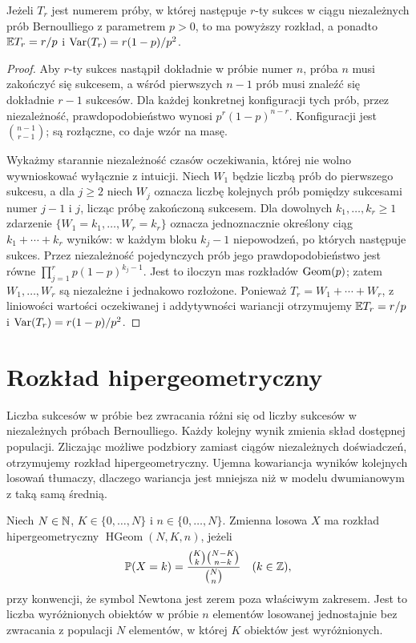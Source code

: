 \begin{stwierdzenie}
Jeżeli $T_r$ jest numerem próby, w której następuje $r$-ty sukces
w ciągu niezależnych prób Bernoulliego z parametrem $p>0$,
to ma powyższy rozkład, a ponadto
$\mathbb{E} T_r=r/p$ i $\operatorname{Var}(T_r)=r(1-p)/p^2$.
\end{stwierdzenie}
\begin{proof}
Aby $r$-ty sukces nastąpił dokładnie w próbie numer $n$,
próba $n$ musi zakończyć się sukcesem, a wśród pierwszych
$n-1$ prób musi znaleźć się dokładnie $r-1$ sukcesów.
Dla każdej konkretnej konfiguracji tych prób, przez
niezależność, prawdopodobieństwo wynosi
$p^r(1-p)^{n-r}$. Konfiguracji jest
$\binom{n-1}{r-1}$; są rozłączne, co daje wzór na masę.

Wykażmy starannie niezależność czasów oczekiwania,
której nie wolno wywnioskować wyłącznie z intuicji.
Niech $W_1$ będzie liczbą prób do pierwszego sukcesu,
a dla $j\geq2$ niech $W_j$ oznacza liczbę kolejnych prób
pomiędzy sukcesami numer $j-1$ i $j$, licząc próbę
zakończoną sukcesem. Dla dowolnych $k_1,\ldots,k_r\geq1$
zdarzenie $\{W_1=k_1,\ldots,W_r=k_r\}$ oznacza
jednoznacznie określony ciąg
$k_1+\cdots+k_r$ wyników: w każdym bloku $k_j-1$
niepowodzeń, po których następuje sukces.
Przez niezależność pojedynczych prób jego
prawdopodobieństwo jest równe
$\prod_{j=1}^r p(1-p)^{k_j-1}$.
Jest to iloczyn mas rozkładów $\operatorname{Geom}(p)$;
zatem $W_1,\ldots,W_r$ są niezależne i jednakowo
rozłożone. Ponieważ $T_r=W_1+\cdots+W_r$,
z liniowości wartości oczekiwanej i addytywności
wariancji otrzymujemy
$\mathbb{E} T_r=r/p$ i $\operatorname{Var}(T_r)=r(1-p)/p^2$.
\end{proof}

\section{Rozkład hipergeometryczny}
Liczba sukcesów w próbie bez zwracania różni się od liczby
sukcesów w niezależnych próbach Bernoulliego. Każdy kolejny
wynik zmienia skład dostępnej populacji. Zliczając możliwe
podzbiory zamiast ciągów niezależnych doświadczeń, otrzymujemy
rozkład hipergeometryczny. Ujemna kowariancja wyników kolejnych
losowań tłumaczy, dlaczego wariancja jest mniejsza niż w modelu
dwumianowym z taką samą średnią.

\begin{definicja}
Niech $N\in\mathbb{N}$, $K\in\{0,\ldots,N\}$
i $n\in\{0,\ldots,N\}$.
Zmienna losowa $X$ ma rozkład hipergeometryczny
$\operatorname{HGeom}(N,K,n)$, jeżeli
\begin{equation}\label{eq:hypergeom}
\mathbb{P}(X=k)=\frac{\binom Kk\binom{N-K}{n-k}}{\binom Nn}
\quad(k\in\mathbb{Z}),
\end{equation}
przy konwencji, że symbol Newtona jest zerem poza właściwym zakresem.
Jest to liczba wyróżnionych obiektów w próbie $n$ elementów
losowanej jednostajnie bez zwracania z populacji $N$ elementów,
w której $K$ obiektów jest wyróżnionych.
\end{definicja}

